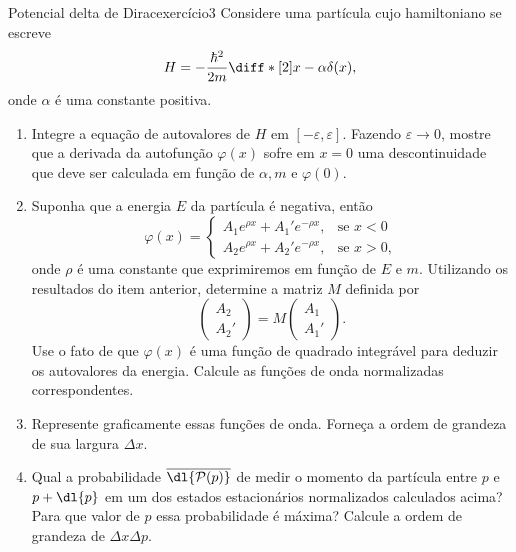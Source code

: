 \begin{exercício}{Potencial delta de Dirac}{exercício3}
    Considere uma partícula cujo hamiltoniano se escreve
    \begin{equation*}
        H = - \frac{\hbar^2}{2m} \diff*[2]{}{x} - \alpha \delta(x),
    \end{equation*}
    onde \(\alpha\) é uma constante positiva.
    \begin{enumerate}[label=(\alph*)]
        \item Integre a equação de autovalores de \(H\) em \([-\varepsilon, \varepsilon]\). Fazendo \(\varepsilon \to 0\), mostre que a derivada da autofunção \(\varphi(x)\) sofre em \(x = 0\) uma descontinuidade que deve ser calculada em função de \(\alpha, m\) e \(\varphi(0)\).
        \item Suponha que a energia \(E\) da partícula é negativa, então
            \begin{equation*}
                \varphi(x) = \begin{cases}
                    A_1 e^{\rho x} + A_1' e^{-\rho x},&\text{se }x < 0\\
                    A_2 e^{\rho x} + A_2' e^{-\rho x},&\text{se }x > 0,
                \end{cases}
            \end{equation*}
            onde \(\rho\) é uma constante que exprimiremos em função de \(E\) e \(m\). Utilizando os resultados do item anterior, determine a matriz \(M\) definida por
            \begin{equation*}
                \begin{pmatrix}
                    A_2\\
                    A_2'
                \end{pmatrix}=
                M
                \begin{pmatrix}
                    A_1\\
                    A_1'
                \end{pmatrix}.
            \end{equation*}
            Use o fato de que \(\varphi(x)\) é uma função de quadrado integrável para deduzir os autovalores da energia. Calcule as funções de onda normalizadas correspondentes.

        \item Represente graficamente essas funções de onda. Forneça a ordem de grandeza de sua largura \(\Delta x\).
        \item Qual a probabilidade \(\overline{\dl{\mathcal{P}(p)}}\) de medir o momento da partícula entre \(p\) e \(p + \dl{p}\) em um dos estados estacionários normalizados calculados acima? Para que valor de \(p\) essa probabilidade é máxima?  Calcule a ordem de grandeza de \(\Delta x \Delta p\).
    \end{enumerate}
\end{exercício}
